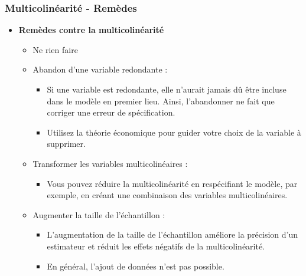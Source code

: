 \documentclass{beamer}
\begin{document}
\begin{frame}
\frametitle{Multicolinéarité - Remèdes}
\begin{itemize}
    \item \textbf{Remèdes contre la multicolinéarité}
    \begin{itemize}
        \item Ne rien faire
        \item Abandon d’une variable redondante :
        \begin{itemize}
            \item Si une variable est redondante, elle n’aurait jamais dû être incluse dans le modèle en premier lieu. Ainsi, l’abandonner ne fait que corriger une erreur de spécification.
            \item Utilisez la théorie économique pour guider votre choix de la variable à supprimer.
        \end{itemize}
        \item Transformer les variables multicolinéaires :
        \begin{itemize}
            \item Vous pouvez réduire la multicolinéarité en respécifiant le modèle, par exemple, en créant une combinaison des variables multicolinéaires.
        \end{itemize}
        \item Augmenter la taille de l’échantillon :
        \begin{itemize}
            \item L’augmentation de la taille de l’échantillon améliore la précision d’un estimateur et réduit les effets négatifs de la multicolinéarité.
            \item En général, l’ajout de données n’est pas possible.
        \end{itemize}
    \end{itemize}
\end{itemize}
\end{frame}
\end{document}
